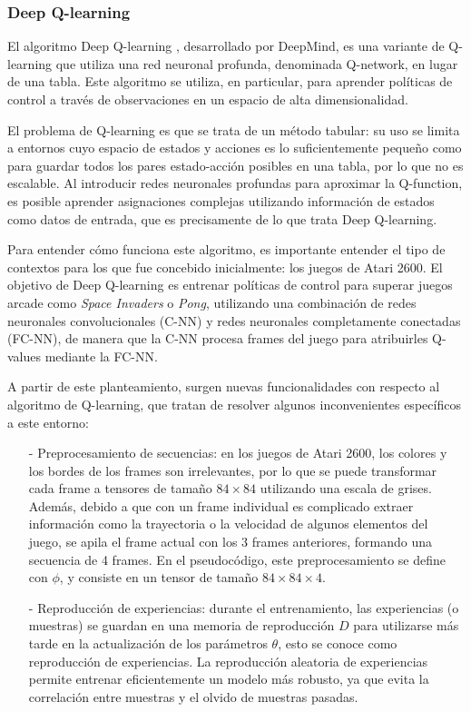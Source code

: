 \subsubsection{Deep Q-learning}

El algoritmo Deep Q-learning \cite{deep-q-learning}, desarrollado por DeepMind, es una variante de Q-learning que utiliza una red neuronal profunda, denominada Q-network, en lugar de una tabla. Este algoritmo se utiliza, en particular, para aprender políticas de control a través de observaciones en un espacio de alta dimensionalidad.

El problema de Q-learning es que se trata de un método tabular: su uso se limita a entornos cuyo espacio de estados y acciones es lo suficientemente pequeño como para guardar todos los pares estado-acción posibles en una tabla, por lo que no es escalable. Al introducir redes neuronales profundas para aproximar la Q-function, es posible aprender asignaciones complejas utilizando información de estados como datos de entrada, que es precisamente de lo que trata Deep Q-learning.

Para entender cómo funciona este algoritmo, es importante entender el tipo de contextos para los que fue concebido inicialmente: los juegos de Atari 2600. El objetivo de Deep Q-learning es entrenar políticas de control para superar juegos arcade como \emph{Space Invaders} o \emph{Pong}, utilizando una combinación de redes neuronales convolucionales (C-NN) y redes neuronales completamente conectadas (FC-NN), de manera que la C-NN procesa frames del juego para atribuirles Q-values mediante la FC-NN.

\newpage

A partir de este planteamiento, surgen nuevas funcionalidades con respecto al algoritmo de Q-learning, que tratan de resolver algunos inconvenientes específicos a este entorno:

\begin{enumerate}
    \item[-] Preprocesamiento de secuencias: en los juegos de Atari 2600, los colores y los bordes de los frames son irrelevantes, por lo que se puede transformar cada frame a tensores de tamaño $84\times84$ utilizando una escala de grises. Además, debido a que con un frame individual es complicado extraer información como la trayectoria o la velocidad de algunos elementos del juego, se apila el frame actual con los 3 frames anteriores, formando una secuencia de 4 frames. En el pseudocódigo, este preprocesamiento se define con $\phi$, y consiste en un tensor de tamaño $84\times84\times4$.
    \item[-] Reproducción de experiencias: durante el entrenamiento, las experiencias (o muestras) se guardan en una memoria de reproducción $D$ para utilizarse más tarde en la actualización de los parámetros $\theta$, esto se conoce como reproducción de experiencias. La reproducción aleatoria de experiencias permite entrenar eficientemente un modelo más robusto, ya que evita la correlación entre muestras y el olvido de muestras pasadas.
\end{enumerate}

